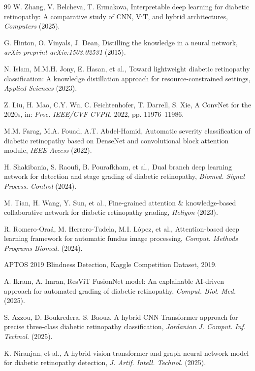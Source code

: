 \documentclass[a4paper,fleqn]{cas-dc}
\begin{document}
\begin{thebibliography}{99}
W. Zhang, V. Belcheva, T. Ermakova,
Interpretable deep learning for diabetic retinopathy: A comparative study of CNN, ViT, and hybrid architectures,
\textit{Computers} (2025).

G. Hinton, O. Vinyals, J. Dean,
Distilling the knowledge in a neural network,
\textit{arXiv preprint arXiv:1503.02531} (2015).

N. Islam, M.M.H. Jony, E. Hasan, et al.,
Toward lightweight diabetic retinopathy classification: A knowledge distillation approach for resource-constrained settings,
\textit{Applied Sciences} (2023).

Z. Liu, H. Mao, C.Y. Wu, C. Feichtenhofer, T. Darrell, S. Xie,
A ConvNet for the 2020s,
in: \textit{Proc. IEEE/CVF CVPR}, 2022, pp. 11976--11986.

M.M. Farag, M.A. Fouad, A.T. Abdel-Hamid,
Automatic severity classification of diabetic retinopathy based on DenseNet and convolutional block attention module,
\textit{IEEE Access} (2022).

H. Shakibania, S. Raoufi, B. Pourafkham, et al.,
Dual branch deep learning network for detection and stage grading of diabetic retinopathy,
\textit{Biomed. Signal Process. Control} (2024).

M. Tian, H. Wang, Y. Sun, et al.,
Fine-grained attention \& knowledge-based collaborative network for diabetic retinopathy grading,
\textit{Heliyon} (2023).

R. Romero-Ora\'{a}, M. Herrero-Tudela, M.I. L\'{o}pez, et al.,
Attention-based deep learning framework for automatic fundus image processing,
\textit{Comput. Methods Programs Biomed.} (2024).

APTOS 2019 Blindness Detection, Kaggle Competition Dataset, 2019.

A. Ikram, A. Imran,
ResViT FusionNet model: An explainable AI-driven approach for automated grading of diabetic retinopathy,
\textit{Comput. Biol. Med.} (2025).

S. Azzou, D. Boukredera, S. Baouz,
A hybrid CNN-Transformer approach for precise three-class diabetic retinopathy classification,
\textit{Jordanian J. Comput. Inf. Technol.} (2025).

K. Niranjan, et al.,
A hybrid vision transformer and graph neural network model for diabetic retinopathy detection,
\textit{J. Artif. Intell. Technol.} (2025).


\end{thebibliography}
\end{document}
